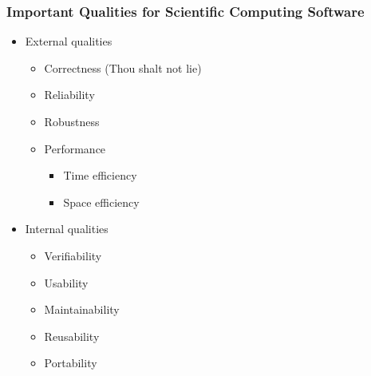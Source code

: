 \documentclass[t,12pt,numbers,fleqn]{beamer}
\begin{document}
\begin{frame}

\frametitle{Important Qualities for Scientific Computing Software}

\begin{itemize}

\item External qualities
\begin{itemize}
\item Correctness (Thou shalt not lie)
\item Reliability
\item Robustness
\item Performance
\begin{itemize}
\item Time efficiency
\item Space efficiency
\end{itemize}
\end{itemize}

\item Internal qualities
\begin{itemize}
\item Verifiability
\item Usability
\item Maintainability
\item Reusability
\item Portability
\end{itemize}

\end{itemize}

\end{frame}

\end{document}
